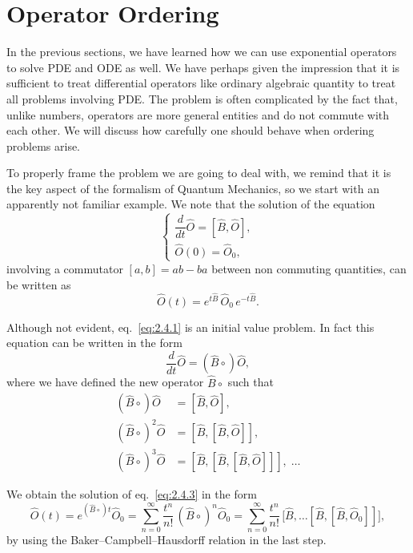 \section{Operator Ordering}

In the previous sections, we have learned how we can use exponential operators to solve PDE and ODE as well. We have perhaps given the impression that it is sufficient to treat differential operators like ordinary algebraic quantity to treat all problems involving PDE. The problem is often complicated by the fact that, unlike numbers, operators are more general entities and do not commute with each other. We will discuss how carefully one should behave when ordering problems arise.

To properly frame the problem we are going to deal with, we remind that it is the key aspect of the formalism of Quantum Mechanics, so we start with an apparently not familiar example. We note that the solution of the equation
\begin{equation}
\begin{cases}
\dfrac{d}{dt}\hat{O}=[\hat{B},\hat{O}],\\[2mm]
\hat{O}(0)=\hat{O}_{0},
\end{cases}
\label{eq:2.4.1}
\end{equation}
involving a commutator $[a,b]=ab-ba$ between non commuting quantities, can be written as
\begin{equation}
\hat{O}(t)=e^{t\hat{B}}\,\hat{O}_{0}\,e^{-t\hat{B}}.
\label{eq:2.4.2}
\end{equation}

Although not evident, eq.~\eqref{eq:2.4.1} is an initial value problem. In fact this equation can be written in the form
\begin{equation}
\frac{d}{dt}\hat{O}=(\hat{B}\circ)\hat{O},
\label{eq:2.4.3}
\end{equation}
where we have defined the new operator $\hat{B}\circ$ such that
\begin{align}
(\hat{B}\circ)\hat{O}&=[\hat{B},\hat{O}],\\
(\hat{B}\circ)^{2}\hat{O}&=[\hat{B},[\hat{B},\hat{O}]],\\
(\hat{B}\circ)^{3}\hat{O}&=[\hat{B},[\hat{B},[\hat{B},\hat{O}]]],\;\ldots
\label{eq:2.4.4}
\end{align}

We obtain the solution of eq.~\eqref{eq:2.4.3} in the form
\begin{equation}
\hat{O}(t)=e^{(\hat{B}\circ)t}\hat{O}_{0}
=\sum_{n=0}^{\infty}\frac{t^{n}}{n!}\,(\hat{B}\circ)^{n}\hat{O}_{0}
=\sum_{n=0}^{\infty}\frac{t^{n}}{n!}\,
\bigl[\hat{B},\ldots[\hat{B},[\hat{B},\hat{O}_{0}]]\bigr],
\label{eq:2.4.5}
\end{equation}
by using the Baker--Campbell--Hausdorff relation in the last step.

